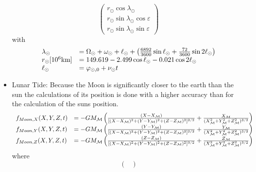 \documentclass[11pt,
               a4paper,
               bibtotoc,
               idxtotoc,
               headsepline,
               footsepline,
               footexclude,
               BCOR12mm,
               DIV13,
               openany,   %
               ]
               {scrbook}
\begin{document}
\begin{itemize}
\begin{equation}
            \begin{pmatrix}
                r_\odot \cos \lambda_\odot\\
                r_\odot \sin \lambda_\odot \cos \varepsilon\\
                r_\odot \sin \lambda_\odot \sin \varepsilon
            \end{pmatrix}
        \end{equation}
        with
        \begin{equation}
            \begin{array}{ll}
                \lambda_\odot &= \Omega_\odot+\omega_\odot+\ell_{\odot}+\left(
                {6892\over3600} \sin \ell_{\odot} + {72\over 3600} \sin 2\ell_{\odot}\right)\\
                r_\odot[10^6\mbox{km}] &=149.619-2.499 \cos \ell_{\odot} - 0.021 \cos 2\ell_{\odot}\\
                \ell_{\odot} &= \varphi_{\odot,0}+\nu_\odot t
            \end{array}
        \end{equation}
        \item Lunar Tide: Because the Moon is significantly closer to the earth than the sun the calculations of its position is done with a higher accuracy than for the calculation of the suns position.
        \begin{equation}
            \begin{array}{ll}
                f_{Moon,X}(X,Y,Z,t) &=-G M_{\mathcal M}\left({(X-X_{\mathcal M})\over [(X-X_{\mathcal M})^2+(Y-Y_{\mathcal M})^2+(Z-Z_{\mathcal M})^2]^{3/2}}
                +{X_{\mathcal M}\over(X_{\mathcal M}^2+Y_{\mathcal M}^2+Z_{\mathcal M}^2)^{3/2}} \right)\\
                f_{Moon,Y}(X,Y,Z,t) &=-G M_{\mathcal M}\left({(Y-Y_{\mathcal M})\over [(X-X_{\mathcal M})^2+(Y-Y_{\mathcal M})^2+(Z-Z_{\mathcal M})^2]^{3/2}}
                +{Y_{\mathcal M}\over(X_{\mathcal M}^2+Y_{\mathcal M}^2+Z_{\mathcal M}^2)^{3/2}} \right)\\
                f_{Moon,Z}(X,Y,Z,t) &=-G M_{\mathcal M}\left({(Z-Z_{\mathcal M})\over [(X-X_{\mathcal M})^2+(Y-Y_{\mathcal M})^2+(Z-Z_{\mathcal M})^2]^{3/2}}
                +{Z_{\mathcal M}\over(X_{\mathcal M}^2+Y_{\mathcal M}^2+Z_{\mathcal M}^2)^{3/2}} \right)
            \end{array}
        \end{equation}
        where
        \begin{equation}
            \begin{pmatrix}

\end{pmatrix}
\end{equation}
\end{itemize}
\end{document}
